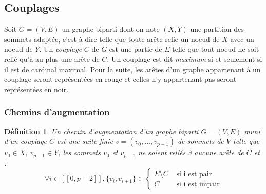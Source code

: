\documentclass[11pt,a4paper]{article}
\newtheorem*{definition}{Définition}
\begin{document}
    \subsection{Couplages}
Soit \(G=(V,E)\) un graphe biparti dont on note \((X,Y)\) une partition des sommets adaptée, c'est-à-dire telle que toute arête relie un noeud de \(X\) avec un noeud de \(Y\). Un \textit{couplage} \(C\) de \(G\) est une partie de \(E\) telle que tout noeud ne soit relié qu'à au plus une arête de \(C\). Un couplage est dit \textit{maximum} si et seulement si il est de cardinal maximal. Pour la suite, les arêtes d'un graphe appartenant à un couplage seront représentées en rouge et celles n'y appartenant pas seront représentées en noir.


      \subsubsection{Chemins d'augmentation}

\begin{definition}
  Un chemin d'augmentation d'un graphe biparti \(G=(V,E)\) muni d'un couplage \(C\) est une suite finie \(v = (v_0, ..., v_{p-1})\) de sommets de \(V\) telle que \(v_0 \in X\), \(v_{p-1} \in Y\), les sommets \(v_0\) et \(v_{p-1}\) ne soient reliés à aucune arête de \(C\) et :
  \[
    \forall i \in [\![0,p-2]\!], \{v_i,v_{i+1}\} \in
      \left\{
        \begin{array}{ll}
          E \setminus C & \text{ si i est pair} \\
          C & \text{ si i est impair}
        \end{array}
      \right.
  \]
\end{definition}
\end{document}
